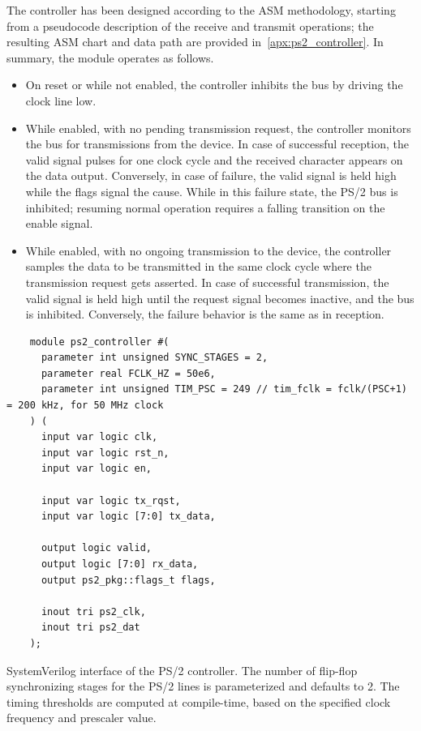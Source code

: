 \begin{description}
    The controller has been designed according to the ASM methodology, starting from a pseudocode description of the receive and transmit operations; the resulting ASM chart and data path are provided in~\cref{apx:ps2_controller}. In summary, the module operates as follows.
    \begin{itemize}
        \item On reset or while not enabled, the controller inhibits the bus by driving the clock line low.
        \item While enabled, with no pending transmission request, the controller monitors the bus for transmissions from the device. In case of successful reception, the valid signal pulses for one clock cycle and the received character appears on the data output. Conversely, in case of failure, the valid signal is held high while the flags signal the cause. While in this failure state, the PS/2 bus is inhibited; resuming normal operation requires a falling transition on the enable signal.
        \item While enabled, with no ongoing transmission to the device, the controller samples the data to be transmitted in the same clock cycle where the transmission request gets asserted. In case of successful transmission, the valid signal is held high until the request signal becomes inactive, and the bus is inhibited. Conversely, the failure behavior is the same as in reception.
    \end{itemize}

    \begin{listing}
    \begin{verbatim}
    module ps2_controller #(
      parameter int unsigned SYNC_STAGES = 2,
      parameter real FCLK_HZ = 50e6,
      parameter int unsigned TIM_PSC = 249 // tim_fclk = fclk/(PSC+1) = 200 kHz, for 50 MHz clock
    ) (
      input var logic clk,
      input var logic rst_n,
      input var logic en,
    
      input var logic tx_rqst,
      input var logic [7:0] tx_data,
    
      output logic valid,
      output logic [7:0] rx_data,
      output ps2_pkg::flags_t flags,
    
      inout tri ps2_clk,
      inout tri ps2_dat
    );
    \end{verbatim}
    \caption{SystemVerilog interface of the PS/2 controller. The number of flip-flop synchronizing stages for the PS/2 lines is parameterized and defaults to 2. The timing thresholds are computed at compile-time, based on the specified clock frequency and prescaler value.}
    \label{lst:ps2_controller}
    \end{listing}


\end{description}
